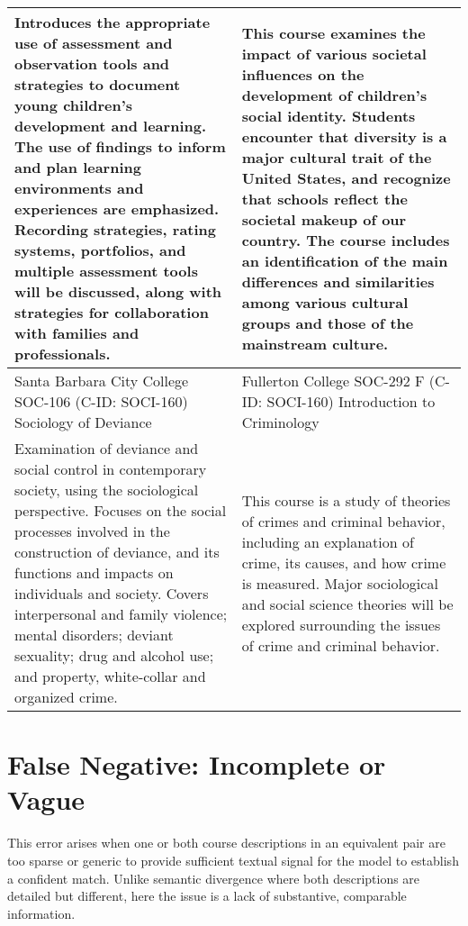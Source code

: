 \begin{longtable}{ >{\baselineskip=12pt}p{}  >{\baselineskip=12pt}p{} }
\midrule
Introduces the appropriate use of assessment and observation tools and strategies to document young children’s development and learning. The use of findings to inform and plan learning environments and experiences are emphasized. Recording strategies, rating systems, portfolios, and multiple assessment tools will be discussed, along with strategies for collaboration with families and professionals. & This course examines the impact of various societal influences on the development of children's social identity. Students encounter that diversity is a major cultural trait of the United States, and recognize that schools reflect the societal makeup of our country. The course includes an identification of the main differences and similarities among various cultural groups and those of the mainstream culture. \\
\bottomrule\toprule
Santa Barbara City College \newline SOC-106 (C-ID: SOCI-160) \newline Sociology of Deviance & Fullerton College \newline SOC-292 F (C-ID: SOCI-160) \newline Introduction to Criminology \\
\midrule
Examination of deviance and social control in contemporary society, using the sociological perspective. Focuses on the social processes involved in the construction of deviance, and its functions and impacts on individuals and society. Covers interpersonal and family violence; mental disorders; deviant sexuality; drug and alcohol use; and property, white-collar and organized crime. & This course is a study of theories of crimes and criminal behavior, including an explanation of crime, its causes, and how crime is measured. Major sociological and social science theories will be explored surrounding the issues of crime and criminal behavior. \\
\bottomrule\toprule
\end{longtable}

\section{False Negative: Incomplete or Vague}\label{app:fnvague}
This error arises when one or both course descriptions in an equivalent pair are too sparse or generic to provide sufficient textual signal for the model to establish a confident match. Unlike semantic divergence where both descriptions are detailed but different, here the issue is a lack of substantive, comparable information.


